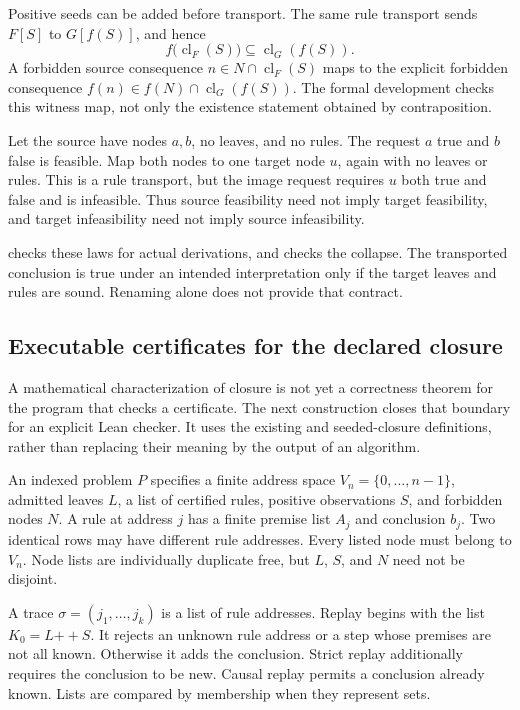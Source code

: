 Positive seeds can be added before transport. The same rule transport sends $F[S]$ to $G[f(S)]$, and hence
\[
 f\bigl(\operatorname{cl}_F(S)\bigr)
      \subseteq\operatorname{cl}_G(f(S)).
\]
A forbidden source consequence $n\in N\cap\operatorname{cl}_F(S)$ maps to the explicit forbidden consequence $f(n)\in f(N)\cap\operatorname{cl}_G(f(S))$. The formal development checks this witness map, not only the existence statement obtained by contraposition.

\begin{PPTexample}
\label{PPT:res:new:collapse}
Let the source have nodes $a,b$, no leaves, and no rules. The request $a$ true and $b$ false is feasible. Map both nodes to one target node $u$, again with no leaves or rules. This is a rule transport, but the image request requires $u$ both true and false and is infeasible. Thus source feasibility need not imply target feasibility, and target infeasibility need not imply source infeasibility.
\end{PPTexample}

 checks these laws for actual derivations, and  checks the collapse. The transported conclusion is true under an intended interpretation only if the target leaves and rules are sound. Renaming alone does not provide that contract.


\subsection{Executable certificates for the declared closure}
\label{PPT:sec:trace-checker}

A mathematical characterization of closure is not yet a correctness theorem for the program that checks a certificate. The next construction closes that boundary for an explicit Lean checker. It uses the existing  and seeded-closure definitions, rather than replacing their meaning by the output of an algorithm.

\begin{PPTdefinition}
\label{PPT:res:trace:problem}
An indexed problem $P$ specifies a finite address space $V_n=\{0,\ldots,n-1\}$, admitted leaves $L$, a list of certified rules, positive observations $S$, and forbidden nodes $N$. A rule at address $j$ has a finite premise list $A_j$ and conclusion $b_j$. Two identical rows may have different rule addresses. Every listed node must belong to $V_n$. Node lists are individually duplicate free, but $L$, $S$, and $N$ need not be disjoint.

A trace $\sigma=(j_1,\ldots,j_k)$ is a list of rule addresses. Replay begins with the list $K_0=L\mathbin{+\!+}S$. It rejects an unknown rule address or a step whose premises are not all known. Otherwise it adds the conclusion. Strict replay additionally requires the conclusion to be new. Causal replay permits a conclusion already known. Lists are compared by membership when they represent sets.
\end{PPTdefinition}

